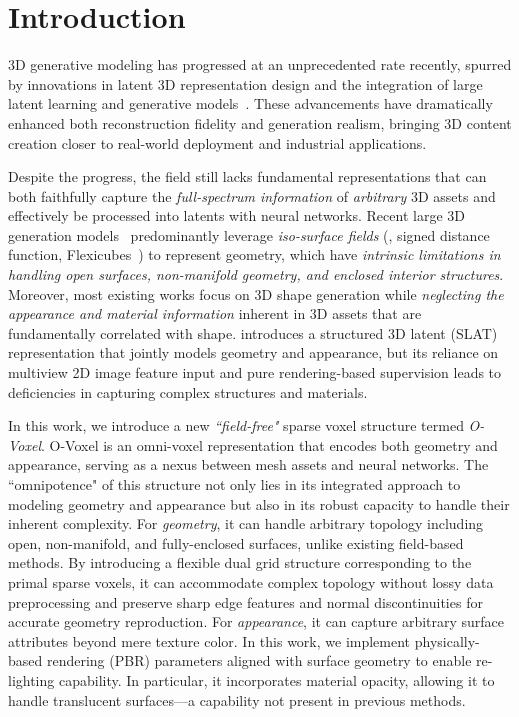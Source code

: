 \documentclass[10pt,twocolumn,letterpaper]{article}
\begin{document}
\section{Introduction}

3D generative modeling has progressed at an unprecedented rate recently, spurred by innovations in latent 3D representation design and the integration of large latent learning and generative models~\cite{zhang2024clay,xiang2025structured,chen2025dora,he2025sparseflex,wu2025direct3d}. These advancements have dramatically enhanced both reconstruction fidelity and generation realism, bringing 3D content creation closer to real-world deployment and industrial applications.

Despite the progress, the field still lacks fundamental representations that can both faithfully capture the \emph{full-spectrum information} of \emph{arbitrary} 3D assets and effectively be processed into latents with neural networks. Recent large 3D generation models~\cite{zhang2024clay,xiang2025structured,chen20243dtopia,chen2025dora,wu2025direct3d,he2025sparseflex,li2025sparc3d} predominantly leverage \emph{iso-surface fields} (\eg, signed distance function, Flexicubes~\cite{shen2023flexicubes}) to represent geometry, which have \emph{intrinsic limitations in handling open surfaces, non-manifold geometry, and enclosed interior structures}. Moreover, most existing works focus on 3D shape generation while \emph{neglecting the appearance and material information} inherent in 3D assets that are fundamentally correlated with shape. \cite{xiang2025structured} introduces a structured 3D latent (SLAT) representation that jointly models geometry and appearance, but its reliance on multiview 2D image feature input and pure rendering-based supervision leads to deficiencies in capturing complex structures and materials.


In this work, we introduce a new \emph{``field-free"} sparse voxel structure termed \emph{O-Voxel}. O-Voxel is an omni-voxel representation that encodes both geometry and appearance, serving as a nexus between mesh assets and neural networks. The ``omnipotence" of this structure not only lies in its integrated approach to modeling geometry and appearance but also in its robust  capacity to handle their inherent complexity. For \emph{geometry}, it can handle arbitrary topology including open, non-manifold, and fully-enclosed surfaces, unlike existing field-based methods.
By introducing a flexible dual grid structure corresponding to the primal sparse voxels, 
it can accommodate complex topology without lossy data preprocessing and preserve sharp edge features and normal discontinuities for accurate geometry reproduction. For \emph{appearance}, it can capture arbitrary surface attributes beyond mere texture color. In this work, we implement physically-based rendering (PBR) parameters aligned with surface geometry to enable re-lighting capability. In particular, it incorporates material opacity, allowing it to handle translucent surfaces—a capability not present in previous methods.
\end{document}
